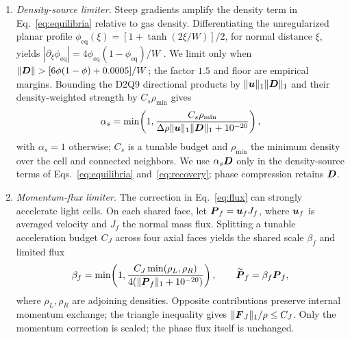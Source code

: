 \begin{enumerate}
      \item \textit{Density-source limiter.}
            Steep gradients amplify the density term in Eq.~\eqref{eq:equilibria}
            relative to gas density. Differentiating the unregularized planar profile
            $\phi_{\mathrm{eq}}(\xi)=[1+\tanh(2\xi/W)]/2$, for normal distance $\xi$,
            yields $|\partial_\xi\phi_{\mathrm{eq}}|=4\phi_{\mathrm{eq}}(1-\phi_{\mathrm{eq}})/W$
            \citep[Eqs.~(2)--(3)]{Hajabdollahi2021}.
            We limit only when
            $\lVert\boldsymbol{D}\rVert>[6\phi(1-\phi)+0.0005]/W$; the factor $1.5$ and
            floor are empirical margins. Bounding the D2Q9 directional products
            by $\lVert\boldsymbol{u}\rVert_1\lVert\boldsymbol{D}\rVert_1$ and their density-weighted
            strength by $C_s\rho_{\min}$ gives
            \begin{equation}
                  \alpha_s=\min\!\left(1,
                  \frac{C_s\rho_{\min}}
                  {\Delta\rho\lVert\boldsymbol{u}\rVert_1\lVert\boldsymbol{D}\rVert_1+10^{-20}}\right),
                  \label{eq:limiter}
            \end{equation}
            with $\alpha_s=1$ otherwise; $C_s$ is a tunable budget and
            $\rho_{\min}$ the minimum density over the cell and connected neighbors.
            We use $\alpha_s\boldsymbol{D}$ only in the density-source terms of
            Eqs.~\eqref{eq:equilibria} and~\eqref{eq:recovery}; phase compression
            retains $\boldsymbol{D}$.

      \item \textit{Momentum-flux limiter.}
            The correction in Eq.~\eqref{eq:flux} can strongly accelerate light
            cells. On each shared face, let $\boldsymbol{P}_f=\boldsymbol{u}_fJ_f$, where
            $\boldsymbol{u}_f$ is averaged velocity and $J_f$ the normal mass flux.
            Splitting a tunable acceleration budget $C_J$ across four axial faces
            yields the shared scale $\beta_f$ and limited flux
            \begin{equation}
                  \beta_f=\min\!\left(1,
                  \frac{C_J\min(\rho_L,\rho_R)}
                  {4(\lVert\boldsymbol{P}_f\rVert_1+10^{-20})}\right),\qquad
                  \widetilde{\boldsymbol{P}}_f=\beta_f\boldsymbol{P}_f,
                  \label{eq:face-limiter}
            \end{equation}
            where $\rho_L,\rho_R$ are adjoining densities. Opposite contributions
            preserve internal momentum exchange; the triangle inequality gives
            $\lVert\boldsymbol{F}_J\rVert_1/\rho\le C_J$. Only the momentum correction
            is scaled; the phase flux itself is unchanged.


\end{enumerate}
